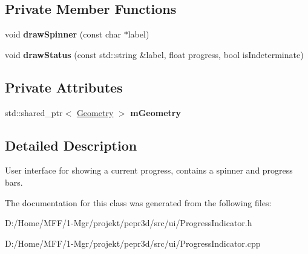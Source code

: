 \subsection*{Private Member Functions}
\begin{DoxyCompactItemize}
\item 
\mbox{\label{classpepr3d_1_1_progress_indicator_a8f0893bc73387592c4013831417f1824}} 
void {\bfseries draw\+Spinner} (const char $\ast$label)
\item 
\mbox{\label{classpepr3d_1_1_progress_indicator_aa4ecbee160baa9e56864d382b737c6dd}} 
void {\bfseries draw\+Status} (const std\+::string \&label, float progress, bool is\+Indeterminate)
\end{DoxyCompactItemize}
\subsection*{Private Attributes}
\begin{DoxyCompactItemize}
\item 
\mbox{\label{classpepr3d_1_1_progress_indicator_a7f971e9165e17d75ea27dbcbc402991d}} 
std\+::shared\+\_\+ptr$<$ \mbox{\hyperlink{classpepr3d_1_1_geometry}{Geometry}} $>$ {\bfseries m\+Geometry}
\end{DoxyCompactItemize}


\subsection{Detailed Description}
User interface for showing a current progress, contains a spinner and progress bars. 

The documentation for this class was generated from the following files\+:\begin{DoxyCompactItemize}
\item 
D\+:/\+Home/\+M\+F\+F/1-\/\+Mgr/projekt/pepr3d/src/ui/Progress\+Indicator.\+h\item 
D\+:/\+Home/\+M\+F\+F/1-\/\+Mgr/projekt/pepr3d/src/ui/Progress\+Indicator.\+cpp\end{DoxyCompactItemize}
